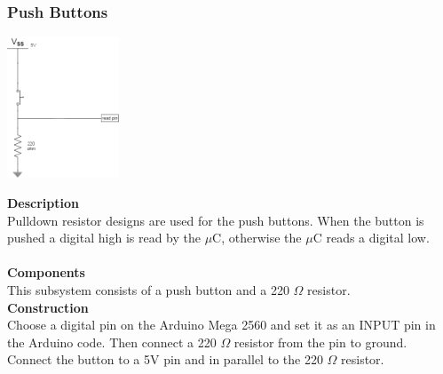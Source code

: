 \documentclass[titlepage]{article}
\begin{document}
\subsubsection{Push Buttons}
\begin{center}
	\includegraphics[width = 0.25\textwidth]{PushButton.png}
\label{fig:PushButtonFig}
\end{center}
\textbf{Description}\\
Pulldown resistor designs are used for the push buttons. When the button is pushed a digital high is read by the $\mu$C, otherwise the $\mu$C reads a digital low.\\\\
\textbf{Components}\\
This subsystem consists of a push button and a 220 $\Omega$ resistor.\\
\textbf{Construction}\\
Choose a digital pin on the Arduino Mega 2560 and set it as an INPUT pin in the Arduino code. Then connect a 220 $\Omega$ resistor from the pin to ground. Connect the button to a 5V pin and in parallel to the 220 $\Omega$ resistor.
\end{document}
